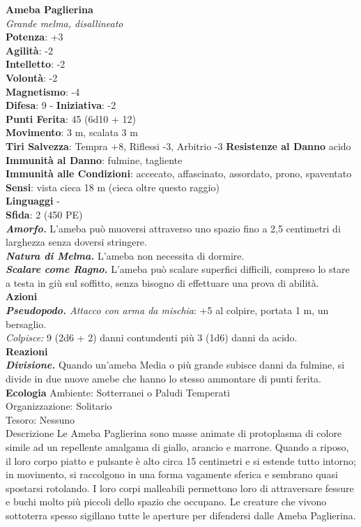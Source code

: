 \begin{multicols}{2}
\medskip\textbf{Ameba Paglierina}\\
\emph{Grande melma, disallineato}\\
\textbf{Potenza}: +3\\
\textbf{Agilità}: -2\\
\textbf{Intelletto}: -2\\
\textbf{Volontà}: -2\\
\textbf{Magnetismo}: -4\\
\textbf{Difesa}: 9 - \textbf{Iniziativa}: -2\\
\textbf{Punti Ferita}: 45 (6d10 + 12)\\
\textbf{Movimento}: 3 m, scalata 3 m\\
\textbf{Tiri Salvezza}: Tempra +8, Riflessi -3, Arbitrio -3
\textbf{Resistenze al Danno} acido\\
\textbf{Immunità al Danno}: fulmine, tagliente\\
\textbf{Immunità alle Condizioni}: accecato, affascinato, assordato, prono, spaventato\\
\textbf{Sensi}: vista cieca 18 m (cieca oltre questo raggio)\\
\textbf{Linguaggi} -\\
\textbf{Sfida}: 2 (450 PE)\smallskip\\
\emph{\textbf{Amorfo.}} L'ameba può muoversi attraverso uno spazio fino a 2,5 centimetri di larghezza senza doversi stringere.\\
\emph{\textbf{Natura di Melma.}} L'ameba non necessita di dormire.\\
\emph{\textbf{Scalare come Ragno.}} L'ameba può scalare superfici difficili, compreso lo stare a testa in giù sul soffitto, senza bisogno di effettuare una prova di abilità.\\
\smallskip\textbf{Azioni}\\
\emph{\textbf{Pseudopodo.} Attacco con arma da mischia}: +5 al colpire, portata 1 m, un bersaglio.\\
\emph{Colpisce:} 9 (2d6 + 2) danni contundenti più 3 (1d6) danni da acido.\\
\textbf{Reazioni}\\
\emph{\textbf{Divisione.}} Quando un'ameba Media o più grande subisce
danni da fulmine, si divide in due nuove amebe che hanno lo stesso ammontare di punti ferita.\\
\textbf{Ecologia}
Ambiente: Sotterranei o Paludi Temperati\\
Organizzazione: Solitario\\
Tesoro: Nessuno\\
Descrizione
Le Ameba Paglierina sono masse animate di protoplasma di colore simile ad un repellente amalgama di giallo, arancio e marrone. Quando a riposo, il loro corpo piatto e pulsante è alto circa 15 centimetri e si estende tutto intorno; in movimento, si raccolgono in una forma vagamente sferica e sembrano quasi spostarsi rotolando. I loro corpi malleabili permettono loro di attraversare fessure e buchi molto più piccoli dello spazio che occupano. Le creature che vivono sottoterra spesso sigillano tutte le aperture per difendersi dalle Ameba Paglierina.\\


\end{multicols}
